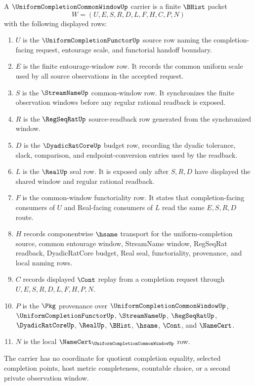 \begin{definition}
\label{def:uniform-completion-common-window-carrier}
A $\UniformCompletionCommonWindowUp$ carrier is a finite $\BHist$ packet
$$
W=(U,E,S,R,D,L,F,H,C,P,N)
$$
with the following displayed rows:
\begin{enumerate}
\item $U$ is the $\UniformCompletionFunctorUp$ source row naming the completion-facing request, entourage scale, and functorial handoff boundary.
\item $E$ is the finite entourage-window row. It records the common uniform scale used by all source observations in the accepted request.
\item $S$ is the $\StreamNameUp$ common-window row. It synchronizes the finite observation windows before any regular rational readback is exposed.
\item $R$ is the $\RegSeqRatUp$ source-readback row generated from the synchronized window.
\item $D$ is the $\DyadicRatCoreUp$ budget row, recording the dyadic tolerance, slack, comparison, and endpoint-conversion entries used by the readback.
\item $L$ is the $\RealUp$ seal row. It is exposed only after $S,R,D$ have displayed the shared window and regular rational readback.
\item $F$ is the common-window functoriality row. It states that completion-facing consumers of $U$ and Real-facing consumers of $L$ read the same $E,S,R,D$ route.
\item $H$ records componentwise $\hsame$ transport for the uniform-completion source, common entourage window, StreamName window, RegSeqRat readback, DyadicRatCore budget, Real seal, functoriality, provenance, and local naming rows.
\item $C$ records displayed $\Cont$ replay from a completion request through $U,E,S,R,D,L,F,H,P,N$.
\item $P$ is the $\Pkg$ provenance over $\UniformCompletionCommonWindowUp$, $\UniformCompletionFunctorUp$, $\StreamNameUp$, $\RegSeqRatUp$, $\DyadicRatCoreUp$, $\RealUp$, $\BHist$, $\hsame$, $\Cont$, and $\NameCert$.
\item $N$ is the local $\NameCert_{\UniformCompletionCommonWindowUp}$ row.
\end{enumerate}
The carrier has no coordinate for quotient completion equality, selected completion points, host metric completeness, countable choice, or a second private observation window.
\end{definition}

